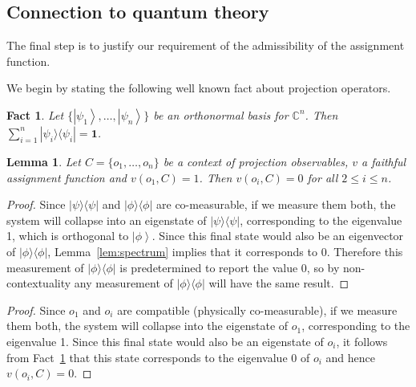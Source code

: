 \documentclass[%
 preprint,
 showpacs,
 showkeys,
 amsmath,
 amssymb,
 aps,
 pra,
 ]{revtex4-1}
\newtheorem{Fact}[Theorem]{Fact}
\newtheorem{Lemma}[Theorem]{Lemma}
\theoremstyle{definition}
\newcommand{\ket}[1]{\left| #1 \right>}
\newcommand{\iprod}[2]{\langle #1 | #2 \rangle}
\newcommand{\oprod}[2]{| #1 \rangle\langle #2 |}
\begin{document}
\subsection{Connection to quantum theory}

The final step is to justify our requirement of the admissibility of the assignment function.

We begin by stating the following well known fact about projection operators.\\
\begin{Fact}\label{fact:completeness}
	Let $\{\ket{\psi_1},\dots,\ket{\psi_n}\}$ be an orthonormal basis for $\mathbb{C}^n$. Then $\sum_{i=1}^n \oprod{\psi_i}{\psi_i}=\mathbf{1}$.\\
\end{Fact}

\begin{Lemma}
\label{lem:yes to no}
Let $C=\{o_1,\dots,o_n\}$ be a context of projection observables, $v$ a faithful assignment function and $v(o_1,C)=1$. Then $v(o_i,C)=0$ for all $2\le i \le n$.
\end{Lemma}
\begin{proof}
Since $\oprod{\psi}{\psi}$ and $\oprod{\phi}{\phi}$ are co-measurable, if we measure them both, the system will collapse into an eigenstate of $\oprod{\psi}{\psi}$,
corresponding to the eigenvalue 1, which is orthogonal to $\ket{\phi}$.
Since this final state would also be an eigenvector of $\oprod{\phi}{\phi}$, Lemma~\ref{lem:spectrum} implies that it corresponds to 0.
Therefore this measurement of $\oprod{\phi}{\phi}$ is predetermined to report the value 0, so by non-contextuality any measurement of $\oprod{\phi}{\phi}$ will have the same result.
\end{proof}
\fi
\begin{proof}
Since $o_1$ and $o_i$ are compatible (physically co-measurable), if we measure them both, the system will collapse into the eigenstate of $o_1$,
 corresponding to the eigenvalue 1.
Since this final state would also be an eigenstate of $o_i$,
 it follows from Fact~\ref{fact:completeness} that this state corresponds to the eigenvalue 0 of $o_i$ and hence $v(o_i,C)=0$.
\end{proof}
\end{document}
